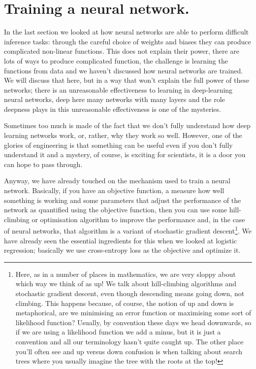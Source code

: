 \documentclass[12pt]{article}
\begin{document}
\section*{Training a neural network.} 

In the last section we looked at how neural networks are able to
perform difficult inference tasks: through the careful choice of
weights and biases they can produce complicated non-linear
functions. This does not explain their power, there are lots of ways
to produce complicated function, the challenge is learning the
functions from data and we haven't discussed how neural networks are
trained. We will discuss that here, but in a way that won't explain
the full power of these networks; there is an unreasonable
effectiveness to learning in deep-learning neural networks, deep here
many networks with many layers and the role deepness plays in this
unreasonable effectiveness is one of the mysteries.

Sometimes too much is made of the fact that we don't fully understand
how deep learning networks work, or, rather, why they work so
well. However, one of the glories of engineering is that something can
be useful even if you don't fully understand it and a mystery, of
course, is exciting for scientists, it is a door you can hope to pass
through.

Anyway, we have already touched on the mechanism used to train a
neural network. Basically, if you have an objective function, a
measure how well something is working and some parameters that adjust
the performance of the network as quantified using the objective
function, then you can use some hill-climbing or optimisation
algorithm to improve the performance and, in the case of neural
networks, that algorithm is a variant of stochastic gradient
descent\footnote{Here, as in a number of places in mathematics, we are
very sloppy about which way we think of as up! We talk about
hill-climbing algorithms and stochastic gradient descent, even though
descending means going down, not climbing. This happens because, of
course, the notion of up and down is metaphorical, are we minimising
an error function or maximising some sort of likelihood function?
Usually, by convention these days we head downwards, so if we are
using a likelihood function we add a minus, but it is just a
convention and all our terminology hasn't quite caught up. The other
place you'll often see and up versus down confusion is when talking
about search trees where you usually imagine the tree with the roots
at the top!}. We have already seen the essential ingredients for this
when we looked at logistic regression; basically we use cross-entropy
loss as the objective and optimize it.
\end{document}
